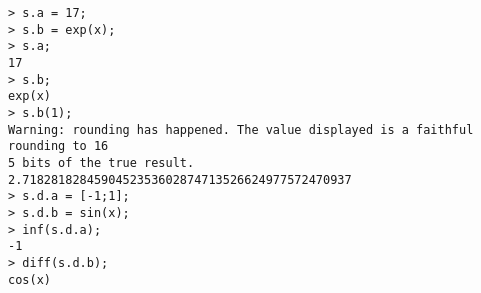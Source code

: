 \begin{center}\begin{minipage}{15cm}\begin{Verbatim}[frame=single]
> s.a = 17;
> s.b = exp(x);
> s.a;
17
> s.b;
exp(x)
> s.b(1);
Warning: rounding has happened. The value displayed is a faithful rounding to 16
5 bits of the true result.
2.7182818284590452353602874713526624977572470937
> s.d.a = [-1;1];
> s.d.b = sin(x);
> inf(s.d.a);
-1
> diff(s.d.b);
cos(x)
\end{Verbatim}
\end{minipage}\end{center}
